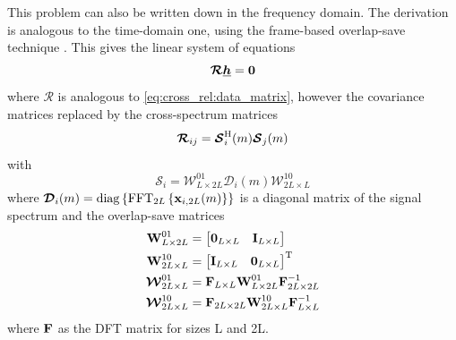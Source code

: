 \documentclass{article}
\newcommand{\x}{\mtxb{x}}
\newcommand{\R}{\mtxb{R}}
\newcommand{\hf}{\underline{\bm{h}}}
\newcommand{\Rf}{\bm{\mathcal{R}}}
\begin{document}

This problem can also be written down in the frequency domain.
The derivation is analogous to the time-domain one, using the frame-based overlap-save technique \cite{}.
This gives the linear system of equations 
\begin{equation}
    \Rf \hf = \bm{0} \label{eq:frequency_domain:null_space}\\
\end{equation}
where \(\Rf\) is analogous to \eqref{eq:cross_rel:data_matrix}, however the covariance matrices replaced by the cross-spectrum matrices 
\begin{equation}
    \Rf_{ij} = \bm{\mathcal{S}}_{i}^\herm (m) \bm{\mathcal{S}}_{j}(m)
\end{equation}
with 
\begin{equation}
    \bm{\mathcal{S}}_{i} = \bm{\mathcal{W}}^{01}_{L \times 2L} \bm{\mathcal{D}}_{i}(m) \bm{\mathcal{W}}^{10}_{2L \times L}
\end{equation}
where \(\bm{\mathcal{D}}_{i}(m) = \operatorname{diag} \left\{ \operatorname{FFT}_{2L} \left\{ \x_{i,2L}(m) \right\} \right\}\) is a diagonal matrix of the signal spectrum and the overlap-save matrices
\begin{align}
    \bm{\mathrm{W}}_{L \times 2L}^{01} &= \begin{bmatrix}
        \bm{\mathrm{0}}_{L \times L} & \bm{\mathrm{I}}_{L \times L}
    \end{bmatrix}\\
    \bm{\mathrm{W}}_{2L \times L}^{10} &= \begin{bmatrix}
        \bm{\mathrm{I}}_{L \times L} & \bm{\mathrm{0}}_{L \times L}
    \end{bmatrix}^{\mathrm{T}}\\
    \bm{\mathcal{W}}_{2L \times L}^{01} &= \bm{\mathrm{F}}_{L \times L} \bm{\mathrm{W}}_{L \times 2L}^{01} \bm{\mathrm{F}}_{2L \times 2L}^{-1}\\
    \bm{\mathcal{W}}_{2L \times L}^{10} &= \bm{\mathrm{F}}_{2L \times 2L} \bm{\mathrm{W}}_{2L \times L}^{10} \bm{\mathrm{F}}_{L \times L}^{-1}
\end{align} where $\bm{\mathrm{F}}$ as the DFT matrix for sizes L and 2L.
\end{document}
